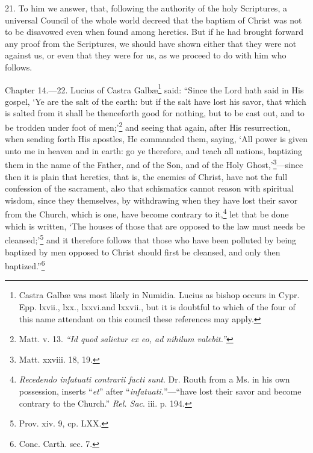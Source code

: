 21. To him we answer, that, following the authority of the holy Scriptures, a universal Council of the whole world decreed that the baptism of Christ was not to be disavowed even when found among heretics. But if he had brought forward any proof from the Scriptures, we should have shown either that they were not against us, or even that they were for us, as we proceed to do with him who follows.


Chapter 14.—22. Lucius of Castra Galbæ\footnote{\par  Castra Galbæ was most likely in Numidia. Lucius as bishop occurs in Cypr. Epp. lxvii., lxx., lxxvi.and lxxvii., but it is doubtful to which of the four of this name attendant on this council these references may apply.} said: ``Since the Lord hath said in His gospel, ‘Ye are the salt of the earth: but if the salt have lost his savor, that which is salted from it shall be thenceforth good for nothing, but to be cast out, and to be trodden under foot of men;’\footnote{\par  Matt. v. 13. \emph{``Id quod salietur ex eo, ad nihilum valebit.''}} and seeing that again, after His resurrection, when sending forth His apostles, He commanded them, saying, ‘All power is given unto me in heaven and in earth: go ye therefore, and teach all nations, baptizing them in the name of the Father, and of the Son, and of the Holy Ghost,’\footnote{\par  Matt. xxviii. 18, 19.}—since then it is plain that heretics, that is, the enemies of Christ, have not the full confession of the sacrament, also that schismatics cannot reason with spiritual wisdom, since they themselves, by withdrawing when they have lost their savor from the Church, which is one, have become contrary to it,\footnote{\par  \emph{Recedendo infatuati contrarii facti sunt}. Dr. Routh from a Ms. in his own possession, inserts ``\emph{et}'' after ``\emph{infatuati.}''—``have lost their savor and become contrary to the Church.'' \emph{Rel. Sac}. iii. p. 194.} let that be done which is written, ‘The houses of those that are opposed to the law must needs be cleansed;’\footnote{\par  Prov. xiv. 9, cp. LXX.} and it therefore follows that those who have been polluted by being baptized by men opposed to Christ should first be cleansed, and only then baptized.''\footnote{\par  Conc. Carth. sec. 7.}

